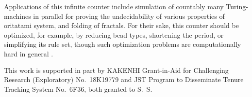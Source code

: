 \documentclass[twocolumn]{svjour3}
\begin{document}
Applications of this infinite counter include simulation of countably many Turing-machines in parallel for proving the undecidability of various properties of oritatami system, and folding of fractals.
For their sake, this counter should be optimized, for example, by reducing bead types, shortening the period, or simplifying its rule set, though such optimization problems are computationally hard in general \cite{HanKim2019,OtaSeki2017}.

\begin{acknowledgements}
This work is supported in part by 
KAKENHI Grant-in-Aid for Challenging Research (Exploratory) No.~18K19779 and 
JST Program to Disseminate Tenure Tracking System No.~6F36, both granted to S.~S.
\end{acknowledgements}




%
%
%
\end{document}
